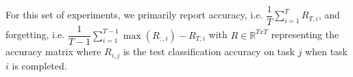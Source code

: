 \documentclass[colorinlistoftodos]{article} %
\begin{document}
For this set of experiments, we primarily report accuracy, i.e. $\dfrac{1}{T} \sum_{i=1}^T R_{T,i}$, and forgetting, i.e. $\dfrac{1}{T-1} \sum_{i=1}^{T-1} \max(R_{:,i}) - R_{T,i}$
with $R \in \mathbb{R}^{TxT}$ representing the accuracy matrix where $R_{i,j}$ is the test classification accuracy on task $j$ when task $i$ is completed.
\end{document}
